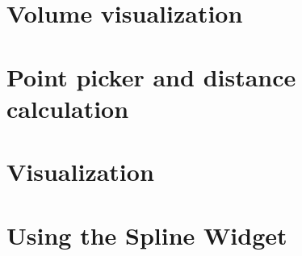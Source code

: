 \section{Volume visualization}


\section{Point picker and distance calculation}


\section{Visualization}


\section{Using the Spline Widget}

